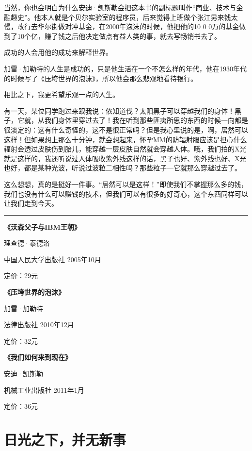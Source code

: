 当然，你也会明白为什么安迪·凯斯勒会把这本书的副标题叫作``商业、技术与金融趣史''。他本人就是个贝尔实验室的程序员，后来觉得上班做个张江男来钱太慢，改行去华尔街做对冲基金，在2000年泡沫的时候，他把他的10
0
0万的基金做到了10个亿，赚了钱之后他决定做点有益人类的事，就去写畅销书去了。

成功的人会用他的成功来解释世界。

加雷·加勒特的人生是成功的，只是他生活在一个不怎么样的年代，他在1930年代的时候写了《压垮世界的泡沫》，所以他会那么悲观地看待银行。

相比之下，我更希望乐观一点的人生。

有一天，某位同学跑过来跟我说：侬知道伐？太阳黑子可以穿越我们的身体！黑子，它就，从我们身体里穿过去了！我在听到那些匪夷所思的东西的时候一向都是很淡定的：这有什么奇怪的，这不是很正常吗？但是我心里说的是，啊，居然可以这样！但如果想上那么十分钟，就会想起来，怀孕MM的防辐射服应该是担心什么辐射会透过皮肤伤到胎儿，能穿越一层皮肤自然就会穿越人体。哦，我们拍的X光就是这样的，我还听说过人体吸收紫外线这样的话，黑子也好、紫外线也好、X光也好，都是某种光波，听说过波粒二相性吗？那些粒子---它就那么穿越过去了。

这么想想，真的是挺好一件事。``居然可以是这样！''即使我们不掌握那么多的钱，我们也没有什么可以赚钱的技术，但我们可以有很多的好奇心，这个东西同样可以让我们走到今天。

\begin{center}\rule{0.5\linewidth}{0.5pt}\end{center}

\textbf{《沃森父子与IBM王朝》}

理查德·泰德洛

中国人民大学出版社 2005年10月

定价：29元

\textbf{《压垮世界的泡沫》}

加雷·加勒特

法律出版社 2010年12月

定价：32元

\textbf{《我们如何来到现在》}

安迪·凯斯勒

机械工业出版社 2011年1月

定价：36元

\hypertarget{ux65e5ux5149ux4e4bux4e0bux5e76ux65e0ux65b0ux4e8b}{%
\section{日光之下，并无新事}\label{ux65e5ux5149ux4e4bux4e0bux5e76ux65e0ux65b0ux4e8b}}

